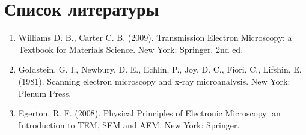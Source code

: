 \documentclass[12pt]{article}
\begin{document}
\section{Список литературы}

\begin{enumerate}
	\item Williams D. B., Carter C. B. (2009). Transmission Electron Microscopy: a Textbook for Materials Science. New York: Springer. 2nd ed.
	\item Goldstein, G. I., Newbury, D. E., Echlin, P., Joy, D. C., Fiori, C., Lifshin, E. (1981). Scanning electron microscopy and x-ray microanalysis. New York: Plenum Press. 
	\item Egerton, R. F. (2008). Physical Principles of Electronic Microscopy: an Introduction to TEM, SEM and AEM.	New York: Springer.  
\end{enumerate}
\end{document}
